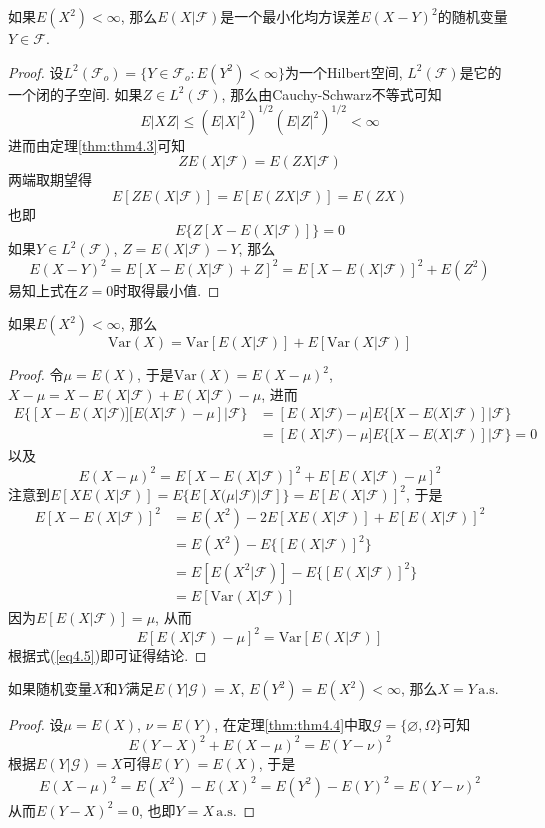 \documentclass[cn, 12pt, math=mtpro2, bibstyle=apa, blue, twocol]{elegantbook}
\newcommand{\F}{\mathcal{F}}
\newcommand{\G}{\mathcal{G}}
\let\emptyset\varnothing
\begin{document}
\begin{theorem}
  如果$E(X^2)<\infty$, 那么$E(X|\F)$是一个最小化均方误差$E(X-Y)^2$的随机变量$Y\in\F$.
\end{theorem}
\begin{proof}
  设$L^2(\F_o)=\{Y\in \F_o: E(Y^2)<\infty\}$为一个Hilbert空间, $L^2(\F)$是它的一个闭的子空间. 如果$Z\in L^2(\F)$, 那么由Cauchy-Schwarz不等式可知
  $$E|XZ|\leq (E|X|^2)^{1/2}(E|Z|^2)^{1/2}<\infty$$
  进而由定理\ref{thm:thm4.3}可知
  $$ZE(X|\F)=E(ZX|\F)$$
  两端取期望得
  $$E[ZE(X|\F)]=E[E(ZX|\F)]=E(ZX)$$
  也即
  $$E\{Z[X-E(X|\F)]\}=0$$
  如果$Y\in L^2(\F)$, $Z=E(X|\F)-Y$, 那么
  $$E(X-Y)^2=E[X-E(X|\F)+Z]^2=E[X-E(X|\F)]^2+E(Z^2)$$
  易知上式在$Z=0$时取得最小值.
\end{proof}
\begin{theorem}\label{thm:thm4.4}
  如果$E(X^2)<\infty$, 那么
  $$\text{Var}(X)=\text{Var}[E(X|\F)]+E[\text{Var}(X|\F)]$$
\end{theorem}
\begin{proof}
  令$\mu=E(X)$, 于是$\text{Var}(X)=E(X-\mu)^2$, $X-\mu=X-E(X|\F)+E(X|\F)-\mu$, 进而
  \begin{align*}
  E\{[X-E(X|\F)][E(X|\F)-\mu]|\F\}&=[E(X|\F)-\mu]E\{[X-E(X|\F)]|\F\} \\
  &=[E(X|\F)-\mu]E\{[X-E(X|\F)]|\F\}=0
  \end{align*}
  以及
  \begin{equation}\label{eq4.5}
    E(X-\mu)^2=E[X-E(X|\F)]^2+E[E(X|\F)-\mu]^2
  \end{equation}
  注意到$E[XE(X|\F)]=E\{E[X(\mu|\F)|\F]\}=E[E(X|\F)]^2$, 于是
  \begin{align*}
  E[X-E(X|\F)]^2&=E(X^2)-2E[XE(X|\F)]+E[E(X|\F)]^2 \\
  &=E(X^2)-E\{[E(X|\F)]^2\} \\
  &=E[E(X^2|\F)]-E\{[E(X|\F)]^2\} \\
  &=E[\text{Var}(X|\F)]
  \end{align*}
  因为$E[E(X|\F)]=\mu$, 从而
  $$E[E(X|\F)-\mu]^2=\text{Var}[E(X|\F)]$$
  根据式(\ref{eq4.5})即可证得结论.
\end{proof}

\begin{example}
如果随机变量$X$和$Y$满足$E(Y|\G)=X$, $E(Y^2)=E(X^2)<\infty$, 那么$X=Y\,\text{a.s.}$
\end{example}
\begin{proof}
  设$\mu=E(X)$, $\nu=E(Y)$, 在定理\ref{thm:thm4.4}中取$\G=\{\emptyset,\Omega\}$可知
  $$E(Y-X)^2+E(X-\mu)^2=E(Y-\nu)^2$$
  根据$E(Y|\G)=X$可得$E(Y)=E(X)$, 于是
  \begin{align*}
  E(X-\mu)^2=E(X^2)-E(X)^2=E(Y^2)-E(Y)^2=E(Y-\nu)^2
  \end{align*}
  从而$E(Y-X)^2=0$, 也即$Y=X\,\text{a.s.}$
\end{proof}
\end{document}
